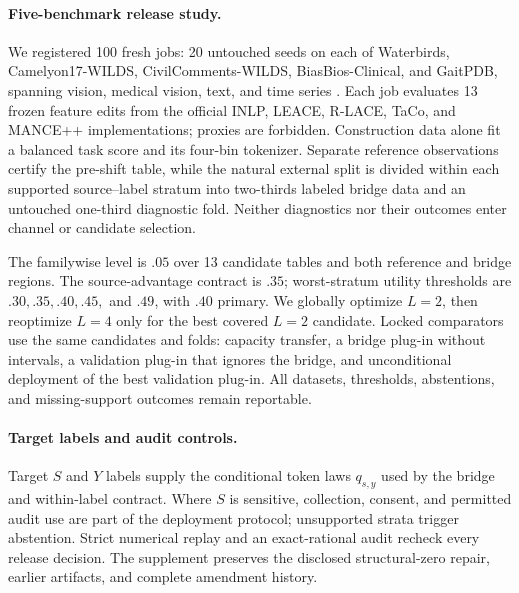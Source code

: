 \paragraph{Five-benchmark release study.}
We registered 100 fresh jobs: 20 untouched seeds on each of Waterbirds,
Camelyon17-WILDS, CivilComments-WILDS, BiasBios-Clinical, and GaitPDB, spanning
vision, medical vision, text, and time series \citep{koh2021wilds}. Each job evaluates 13 frozen
feature edits from the official INLP, LEACE, R-LACE, TaCo, and MANCE++
implementations; proxies are forbidden. Construction data alone fit a balanced
task score and its four-bin tokenizer. Separate reference observations certify
the pre-shift table, while the natural external split is divided within each
supported source--label stratum into two-thirds labeled bridge data and an
untouched one-third diagnostic fold. Neither diagnostics nor their outcomes
enter channel or candidate selection.

The familywise level is $.05$ over 13 candidate tables and both reference and
bridge regions. The source-advantage contract is $.35$; worst-stratum utility
thresholds are $.30,.35,.40,.45,$ and $.49$, with $.40$ primary. We globally
optimize $L=2$, then reoptimize $L=4$ only for the best covered $L=2$
candidate. Locked comparators use the same candidates and folds: capacity
transfer, a bridge
plug-in without intervals, a validation plug-in that ignores the bridge, and
unconditional deployment of the best validation plug-in. All datasets,
thresholds, abstentions, and missing-support outcomes remain reportable.

\paragraph{Target labels and audit controls.}
Target $S$ and $Y$ labels supply the conditional token laws $q_{s,y}$ used by
the bridge and within-label contract. Where $S$ is sensitive, collection,
consent, and permitted audit use are part of the deployment protocol;
unsupported strata trigger abstention. Strict numerical replay and an
exact-rational audit recheck every release decision. The supplement preserves
the disclosed structural-zero repair, earlier artifacts, and complete
amendment history.

